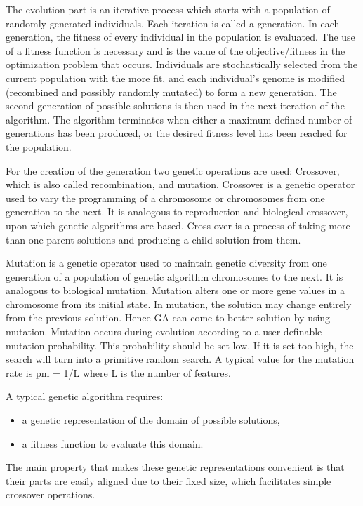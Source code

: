 \documentclass[11pt,onecolumn,a4paper]{article}
\begin{document}
The evolution part is an iterative process which starts with a population of randomly generated individuals. Each iteration is called a generation. In each generation, the fitness of every individual in the population is evaluated. The use of a fitness function is necessary and is the value of the objective/fitness in the optimization problem that occurs. Individuals are stochastically selected from the current population with the more fit, and each individual's genome is modified (recombined and possibly randomly mutated) to form a new generation. The second generation of possible solutions is then used in the next iteration of the algorithm. The algorithm terminates when either a maximum defined number of generations has been produced, or the desired fitness level has been reached for the population.\cite{mel1}

For the creation of the generation two genetic operations are used: Crossover, which is also called recombination, and mutation. Crossover is a genetic operator used to vary the programming of a chromosome or chromosomes from one generation to the next. It is analogous to reproduction and biological crossover, upon which genetic algorithms are based. Cross over is a process of taking more than one parent solutions and producing a child solution from them. \cite{dar1}

Mutation is a genetic operator used to maintain genetic diversity from one generation of a population of genetic algorithm chromosomes to the next. It is analogous to biological mutation. Mutation alters one or more gene values in a chromosome from its initial state. In mutation, the solution may change entirely from the previous solution. Hence GA can come to better solution by using mutation. Mutation occurs during evolution according to a user-definable mutation probability. This probability should be set low. If it is set too high, the search will turn into a primitive random search. A typical value for the mutation rate  is p{\scriptsize m} = 1/L where L is the number of features. \cite{dar2}



A typical genetic algorithm requires:
\begin{itemize}
\item {a genetic representation of the domain of possible solutions,}
\item {a fitness function to evaluate this domain.}
\end{itemize}


  The main property that makes these genetic representations convenient is that their parts are easily aligned due to their fixed size, which facilitates simple crossover operations.
\end{document}
